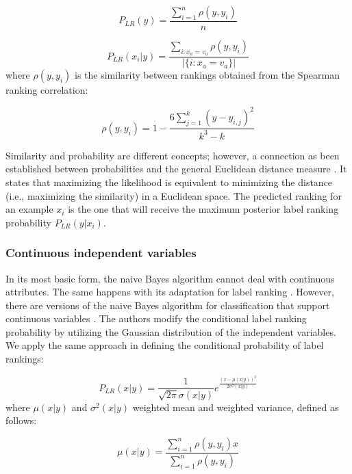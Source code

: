 \begin{equation}
P_{LR}(y) = \frac{\sum_{i=1}^{n} \rho(y,y_i)}{n}
\label{ch4-eq:prior}
\end{equation}

\begin{equation}
P_{LR}(x_i|y)= \frac{\sum_{i: x_{a} = v_{a}}\rho(y, y_i)}{|\{i: x_{a} = v_{a}\}|}
\label{ch4-eq:cond}
\end{equation}
where  $\rho(y,y_i)$ is the similarity between rankings obtained from the Spearman ranking correlation:

\begin{equation}
\rho(y,y_i)=1-\frac{6\sum_{j=1}^k(y-y_{i,j})^2}{k^3-k}
\label{ch4-eq:spearman}
\end{equation}

Similarity and probability are different concepts; however, a connection as been established between probabilities and the general Euclidean distance measure \citep{vogt2007}. It states  that maximizing the likelihood is equivalent to minimizing the distance (i.e., maximizing the similarity) in a Euclidean space. The predicted ranking for an example $x_i$ is the one that will receive the maximum posterior label ranking probability $P_{LR}(y|x_i)$.


\subsubsection{Continuous independent variables}
\label{ch4-sec:cont}
In its most basic form, the naive Bayes algorithm cannot deal with continuous attributes. The same happens with its adaptation for label ranking \citep{aiguzhinov2010}. However, there are versions of the naive Bayes algorithm for classification that support continuous variables \citep{bouckaert2005}. The authors modify the  conditional label ranking probability  by utilizing the Gaussian distribution of the independent variables. We apply the same approach  in defining the conditional  probability of label rankings:

\begin{equation}
\label{ch4-cont}
P_{LR}(x|y)=\frac{1}{\sqrt{2\pi}\sigma(x|y)}e^\frac{(x-\mu(x|y))^2}{2\sigma^2(x|y)}
\end{equation}
where $\mu(x|y)$ and $\sigma^2(x|y)$ weighted  mean and weighted variance, defined as follows:

\begin{equation}
\label{ch4-mu}
\mu(x|y) =\frac{\sum_{i=1}^n  \rho(y,y_i) x}{\sum_{i=1}^n \rho(y,y_i)}
\end{equation}

